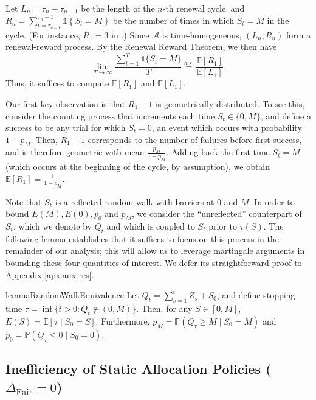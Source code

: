 \documentclass[mnsc,nonblindrev]{informs3}
\newcommand{\E}{\mathbb{E}}
\newcommand{\pr}{\mathbb{P}}
\newcommand{\policy}{\mathcal{A}}
\newcommand{\ind}[1]{\mathds{1}\left\{#1\right\}}
\newcommand{\Dfair}{\Delta_{\text{Fair}}\xspace}
\renewenvironment{proof}[1][Proof]{%
  \par\noindent{\itshape #1.} \ignorespaces
}{%
  \hfill\Halmos\par
}
\begin{document}
\begin{proof}[Proof sketch]
Let $L_n = \tau_{n} - \tau_{n-1}$ be the length of the $n$-th renewal cycle, and $R_n = \sum_{t=\tau_{n-1}}^{\tau_n-1} \ind{S_t = M}$ be the number of times in which $S_t = M$ in the cycle. (For instance, $R_1 = 3$ in .) Since $\policy$ is time-homogeneous, 
$(L_n, R_n)$ form a renewal-reward process. By the Renewal Reward Theorem, we then have
\begin{equation}\label{eq:renewal-reward_expression}
    \lim_{T \rightarrow \infty}\frac{\sum_{t=1}^T\mathds{1}\{S_t = M\}}{T} \stackrel{a.s.}{=} \frac{\E[R_1]}{\E[L_1]}.
\end{equation}
Thus, it suffices to compute $\E[R_1]$ and $\E[L_1]$. 

Our first key observation is that $R_1-1$ is geometrically distributed. To see this, consider the counting process that increments each time $S_t \in \{0,M\}$, and define a success to be any trial for which $S_t = 0$, an event which occurs with probability $1-p_M$. Then, $R_1-1$ corresponds to the number of failures before first success, and is therefore geometric with mean $\frac{p_M}{1-p_M}$. Adding back the first time $S_t = M$ (which occurs at the beginning of the cycle, by assumption), we obtain $\E[R_1] = \frac{1}{1-p_M}$.
\end{proof}

\medskip 
Note that $S_t$ is a reflected random walk with barriers at 0 and $M$. In order to bound $E(M), E(0), p_0$ and $p_M$, we consider the ``unreflected'' counterpart of $S_t$, which we denote by $Q_t$ and which is coupled to $S_t$ prior to $\tau(S)$. The following lemma establishes that it suffices to focus on this process in the remainder of our analysis; this will allow us to leverage martingale arguments in bounding these four quantities of interest. We defer its straightforward proof to Appendix \ref{apx:aux-res}.

\begin{restatable}{lemma}{RandomWalkEquivalence}
\label{lem:Random_walk_equivalence_1}
Let $Q_t = \sum_{s=1}^t Z_s + S_0$, and define stopping time \mbox{$\tau = \inf\{t > 0: Q_t \not\in (0, M)\}$}. Then, for any $S \in [0, M]$, $E(S) = \E[\tau \mid S_0 = S]$. Furthermore, \mbox{$p_M = \pr(Q_{\tau} \geq M \mid S_0 = M)$} and $p_0 = \pr(Q_{\tau} \leq 0 \mid S_0 = 0)$.
\end{restatable}

\subsection{Inefficiency of Static Allocation Policies ($\Dfair=0$)} 
\label{ssec:fixed_policy} 
\end{document}
